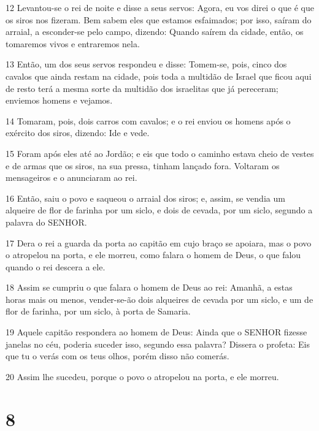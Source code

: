 \par 12 Levantou-se o rei de noite e disse a seus servos: Agora, eu vos direi o que é que os siros nos fizeram. Bem sabem eles que estamos esfaimados; por isso, saíram do arraial, a esconder-se pelo campo, dizendo: Quando saírem da cidade, então, os tomaremos vivos e entraremos nela.
\par 13 Então, um dos seus servos respondeu e disse: Tomem-se, pois, cinco dos cavalos que ainda restam na cidade, pois toda a multidão de Israel que ficou aqui de resto terá a mesma sorte da multidão dos israelitas que já pereceram; enviemos homens e vejamos.
\par 14 Tomaram, pois, dois carros com cavalos; e o rei enviou os homens após o exército dos siros, dizendo: Ide e vede.
\par 15 Foram após eles até ao Jordão; e eis que todo o caminho estava cheio de vestes e de armas que os siros, na sua pressa, tinham lançado fora. Voltaram os mensageiros e o anunciaram ao rei.
\par 16 Então, saiu o povo e saqueou o arraial dos siros; e, assim, se vendia um alqueire de flor de farinha por um siclo, e dois de cevada, por um siclo, segundo a palavra do SENHOR.
\par 17 Dera o rei a guarda da porta ao capitão em cujo braço se apoiara, mas o povo o atropelou na porta, e ele morreu, como falara o homem de Deus, o que falou quando o rei descera a ele.
\par 18 Assim se cumpriu o que falara o homem de Deus ao rei: Amanhã, a estas horas mais ou menos, vender-se-ão dois alqueires de cevada por um siclo, e um de flor de farinha, por um siclo, à porta de Samaria.
\par 19 Aquele capitão respondera ao homem de Deus: Ainda que o SENHOR fizesse janelas no céu, poderia suceder isso, segundo essa palavra? Dissera o profeta: Eis que tu o verás com os teus olhos, porém disso não comerás.
\par 20 Assim lhe sucedeu, porque o povo o atropelou na porta, e ele morreu.

\chapter{8}

